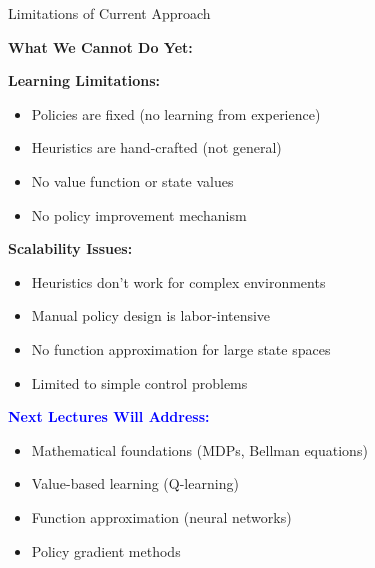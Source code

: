 \documentclass[aspectratio=169,10pt]{beamer}
\begin{document}
\begin{frame}{Limitations of Current Approach}

\textbf{What We Cannot Do Yet:}

\vfill

\textbf{Learning Limitations:}
\begin{itemize}
    \item Policies are fixed (no learning from experience)
    \item Heuristics are hand-crafted (not general)
    \item No value function or state values
    \item No policy improvement mechanism
\end{itemize}

\vfill

\textbf{Scalability Issues:}
\begin{itemize}
    \item Heuristics don't work for complex environments
    \item Manual policy design is labor-intensive
    \item No function approximation for large state spaces
    \item Limited to simple control problems
\end{itemize}

\vfill

\textcolor{blue}{\textbf{Next Lectures Will Address:}}
\begin{itemize}
    \item Mathematical foundations (MDPs, Bellman equations)
    \item Value-based learning (Q-learning)
    \item Function approximation (neural networks)
    \item Policy gradient methods
\end{itemize}

\end{frame}
\end{document}
